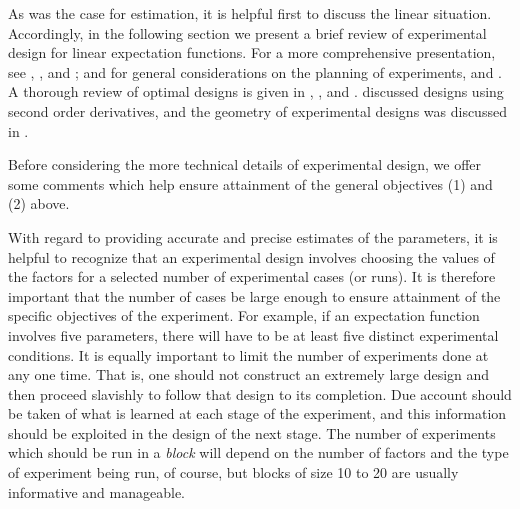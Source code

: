 As was the case for estimation, it is helpful first to
discuss the linear situation.
Accordingly, in the following section we present a brief review
of experimental design for linear expectation functions.
For a more comprehensive presentation, see
,
, and ; and
for general considerations on the planning of experiments,
 and
.
A thorough review of optimal designs is given in
,
, and .
 discussed designs using second order
derivatives, and
the geometry of experimental designs was discussed in
.

Before considering the more technical details of experimental
design, we offer some comments which help ensure
attainment of the general objectives (1) and (2) above.

With regard to providing accurate and precise estimates of the
parameters, it is helpful to recognize that an experimental
design involves choosing the values of the factors for a selected
number of experimental cases (or runs).
It is therefore important that the number of cases be large
enough to ensure attainment of the specific objectives of the experiment.
For example, if an expectation function involves five
parameters, there will have to be at least five distinct
experimental conditions.
It is equally important to limit the number of experiments done
at any one time.
That is, one should not construct an extremely large design and
then proceed slavishly to follow that design to its completion.
Due account should be taken of what is learned at each stage of
the experiment, and this information should be exploited in the
design of the next stage.
The number of experiments which should be run in a {\em block\/}
will depend on the number of factors and the type of experiment
being run, of course, but blocks of size 10 to 20 are usually
informative and manageable.

